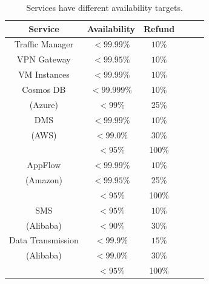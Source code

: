 \documentclass[sigconf]{acmart}
\begin{document}
\begin{table}
\small
\centering
\caption{Services have different availability targets.}\label{target}
\renewcommand{\arraystretch}{1.0}
\begin{tabular}{|c|l|l|l|l|l|l|l|} \hline
\setlength{\tabcolsep}{10pt}
\textbf{Service}&\multicolumn{2}{|c|}{\textbf{Availability}}&\multicolumn{2}{|c|}{\textbf{Refund}}\\
\hline
{Traffic Manager \cite{azure}}&\multicolumn{2}{|c|}{$< 99.99\%$}&\multicolumn{2}{|c|}{$10\%$}\\
\hline
{VPN Gateway \cite{azure}}&\multicolumn{2}{|c|}{$< 99.95\%$}&\multicolumn{2}{|c|}{$10\%$} \\
\hline
{VM Instances \cite{amazon}}&\multicolumn{2}{|c|}{$< 99.99\%$}&\multicolumn{2}{|c|}{$10\%$} \\
\hline
{Cosmos DB \cite{azure}}&\multicolumn{2}{|c|}{$< 99.999\%$}&\multicolumn{2}{|c|}{$10\%$}\\
(Azure)&\multicolumn{2}{|c|}{$< 99\%$}&\multicolumn{2}{|c|}{25\%} \\
\hline
{DMS \cite{amazon2}}&\multicolumn{2}{|c|}{$< 99.99\%$}&\multicolumn{2}{|c|}{$10\%$}\\
(AWS)&\multicolumn{2}{|c|}{$< 99.0\%$}&\multicolumn{2}{|c|}{30\%}\\
&\multicolumn{2}{|c|}{$< 95\%$}&\multicolumn{2}{|c|}{100\%}\\
\hline
{AppFlow\cite{amazon3}}&\multicolumn{2}{|c|}{$< 99.99\%$}&\multicolumn{2}{|c|}{$10\%$}\\
(Amazon)&\multicolumn{2}{|c|}{$< 99.95\%$}&\multicolumn{2}{|c|}{25\%} \\
&\multicolumn{2}{|c|}{$< 95\%$}&\multicolumn{2}{|c|}{100\%} \\
\hline
{SMS\cite{alibaba3}}&\multicolumn{2}{|c|}{$< 95\%$}&\multicolumn{2}{|c|}{$10\%$}\\
(Alibaba)&\multicolumn{2}{|c|}{$< 90\%$}&\multicolumn{2}{|c|}{30\%}\\
\hline
{Data Transmission\cite{alibaba2}}&\multicolumn{2}{|c|}{$< 99.9\%$}&\multicolumn{2}{|c|}{$15\%$}\\
(Alibaba) &\multicolumn{2}{|c|}{$< 99.0\%$}&\multicolumn{2}{|c|}{30\%} \\
&\multicolumn{2}{|c|}{$< 95\%$}&\multicolumn{2}{|c|}{100\%} \\
\hline
\end{tabular}
\end{table}
\end{document}
